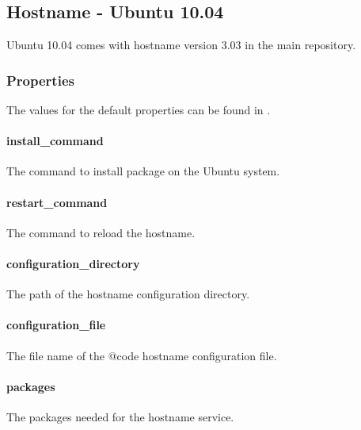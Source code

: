 \subsection{Hostname - Ubuntu 10.04}

Ubuntu 10.04 comes with hostname version 3.03 in the main repository.

\subsubsection{Properties}

The values for the default properties can be found
in .

\paragraph{install\_command}


The command to install package on the Ubuntu system.

\paragraph{restart\_command}


The command to reload the hostname.

\paragraph{configuration\_directory}


The path of the hostname configuration directory.

\paragraph{configuration\_file}


The file name of the {@code hostname} configuration file.

\paragraph{packages}


The packages needed for the hostname service.

